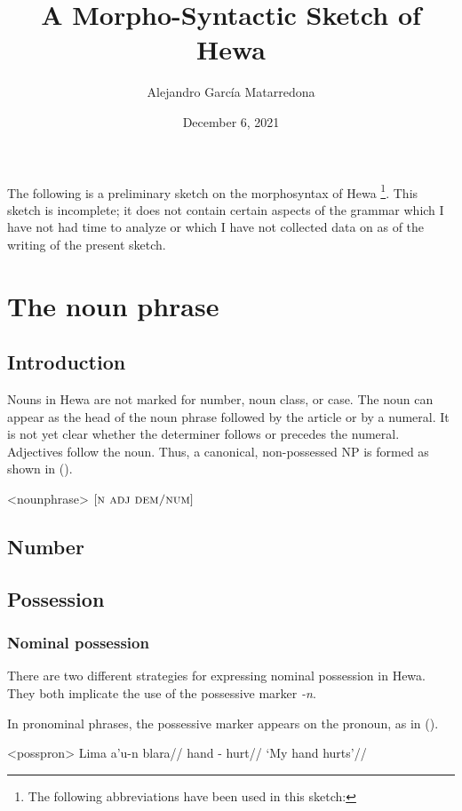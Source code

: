 \documentclass[12pt]{article}
\author{Alejandro García Matarredona}
\title{A Morpho-Syntactic Sketch of Hewa}
\date{December 6, 2021}
\begin{document}
The following is a preliminary sketch on the morphosyntax of Hewa \footnote{The following abbreviations have been used in this sketch: \printglossaries}. This sketch is incomplete; it does not contain certain aspects of the grammar which I have not had time to analyze or which I have not collected data on as of the writing of the present sketch.

\section{The noun phrase}\label{sec:nphr}

\subsection{Introduction}\label{sec:nphr.intr}

Nouns in Hewa are not marked for number, noun class, or case. The noun can appear as the head of the noun phrase followed by the article or by a numeral. It is not yet clear whether the determiner follows or precedes the numeral. Adjectives follow the noun. Thus, a canonical, non-possessed NP is formed as shown in ().

\ex<nounphrase>
$[\textsc{n adj dem/num}]$
\xe



\subsection{Number}

\subsection{Possession}

\subsubsection{Nominal possession}

There are two different strategies for expressing nominal possession in Hewa. They both implicate the use of the possessive marker \textit{-n}.

In pronominal phrases, the possessive marker appears on the pronoun, as in ().

\pex<posspron> %
\begingl %
\gla Lima a'u-n blara//
\glb hand \First{}\Sg{}-\Poss{} hurt//
\glft `My hand hurts'//
\endgl
\end{document}
